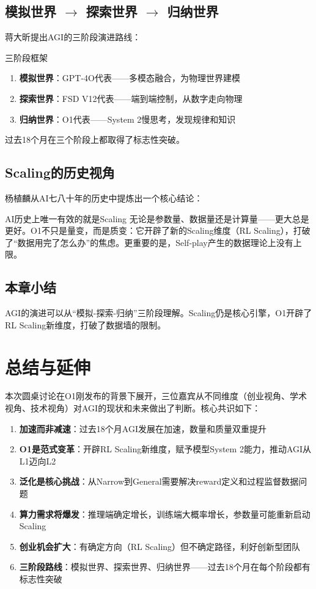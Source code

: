 \documentclass[a4paper]{article}
\begin{document}
\subsection{模拟世界 $\rightarrow$ 探索世界 $\rightarrow$ 归纳世界}

蒋大昕提出AGI的三阶段演进路线：

\begin{knowledgebox}{三阶段框架}
\begin{enumerate}
\item \textbf{模拟世界}：GPT-4O代表——多模态融合，为物理世界建模
\item \textbf{探索世界}：FSD V12代表——端到端控制，从数字走向物理
\item \textbf{归纳世界}：O1代表——System 2慢思考，发现规律和知识
\end{enumerate}
过去18个月在三个阶段上都取得了标志性突破。
\end{knowledgebox}

\subsection{Scaling的历史视角}

杨植麟从AI七八十年的历史中提炼出一个核心结论：

\begin{importantbox}{AI历史上唯一有效的就是Scaling}
无论是参数量、数据量还是计算量——更大总是更好。O1不只是量变，而是质变：它开辟了新的Scaling维度（RL Scaling），打破了``数据用完了怎么办''的焦虑。更重要的是，Self-play产生的数据理论上没有上限。
\end{importantbox}

\subsection{本章小结}

AGI的演进可以从``模拟-探索-归纳''三阶段理解。Scaling仍是核心引擎，O1开辟了RL Scaling新维度，打破了数据墙的限制。


\section{总结与延伸}

本次圆桌讨论在O1刚发布的背景下展开，三位嘉宾从不同维度（创业视角、学术视角、技术视角）对AGI的现状和未来做出了判断。核心共识如下：

\begin{enumerate}
\item \textbf{加速而非减速}：过去18个月AGI发展在加速，数量和质量双重提升
\item \textbf{O1是范式变革}：开辟RL Scaling新维度，赋予模型System 2能力，推动AGI从L1迈向L2
\item \textbf{泛化是核心挑战}：从Narrow到General需要解决reward定义和过程监督数据问题
\item \textbf{算力需求将爆发}：推理端确定增长，训练端大概率增长，参数量可能重新启动Scaling
\item \textbf{创业机会扩大}：有确定方向（RL Scaling）但不确定路径，利好创新型团队
\item \textbf{三阶段路线}：模拟世界、探索世界、归纳世界——过去18个月在每个阶段都有标志性突破
\end{enumerate}
\end{document}
